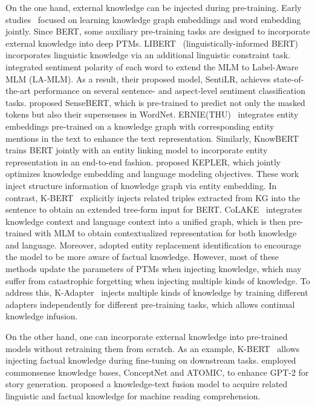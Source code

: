 \documentclass[fleqn]{SCYE-arxiv}
\begin{document}
\begin{multicols}{2}
On the one hand, external knowledge can be injected during pre-training.
Early studies~\cite{wang2014knowledge,zhong2015aligning,xie2016representation,xu2017knowledge} focused on learning knowledge graph embeddings and word embedding jointly.
Since BERT, some auxiliary pre-training tasks are designed to incorporate external knowledge into deep PTMs.
LIBERT~\cite{Lauscher2019informing} (linguistically-informed BERT) incorporates linguistic knowledge via an additional linguistic constraint task. \citet{ke2019sentilr} integrated sentiment polarity of each word to extend the MLM to Label-Aware MLM (LA-MLM). As a result, their proposed model, SentiLR, achieves state-of-the-art performance on several sentence- and aspect-level sentiment classification tasks. \citet{levine2019sensebert} proposed SenseBERT, which is pre-trained to predict not only the masked tokens but also their supersenses in WordNet. ERNIE(THU)~\cite{zhang2019ernie} integrates entity embeddings pre-trained on a knowledge graph with corresponding entity mentions in the text to enhance the text representation. Similarly, KnowBERT~\cite{peters2019knowledge} trains BERT jointly with an entity linking model to incorporate entity representation in an end-to-end fashion. \citet{wang2019kepler} proposed KEPLER, which jointly optimizes knowledge embedding and language modeling objectives. These work inject structure information of knowledge graph via entity embedding. In contrast, K-BERT~\cite{liu2019kbert} explicitly injects related triples extracted from KG into the sentence to obtain an extended tree-form input for BERT. CoLAKE~\cite{Sun2020CoLAKE} integrates knowledge context and language context into a unified graph, which is then pre-trained with MLM to obtain contextualized representation for both knowledge and language. Moreover, \citet{xiong2019pretrain} adopted entity replacement identification to encourage the model to be more aware of factual knowledge. However, most of these methods update the parameters of PTMs when injecting knowledge, which may suffer from catastrophic forgetting when injecting multiple kinds of knowledge. To address this, K-Adapter~\cite{wang2020kadapter} injects multiple kinds of knowledge by training different adapters independently for different pre-training tasks, which allows continual knowledge infusion.


On the other hand, one can incorporate external knowledge into pre-trained models without retraining them from scratch. As an example, K-BERT~\cite{liu2019kbert} allows injecting factual knowledge during fine-tuning on downstream tasks. \citet{guan2020knowledge} employed commonsense knowledge bases, ConceptNet and ATOMIC, to enhance GPT-2 for story generation. \citet{yang2019enhancing} proposed a knowledge-text fusion model to acquire related linguistic and factual knowledge for machine reading comprehension.



\end{multicols}
\end{document}
